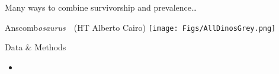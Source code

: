 \documentclass[20pt,usenames,dvipsnames]{beamer}
\begin{document}






\begin{frame}[plain]
\Huge
\begin{center}
Many ways to combine survivorship and prevalence\ldots 
\end{center}
\end{frame}



\begin{frame}[plain]
\Huge
Anscomb\emph{osaurus}~~\small (HT Alberto Cairo)
\texttt{[image: Figs/AllDinosGrey.png]}
\end{frame}


\begin{frame}[plain]
\Large
\begin{block}{Data \& Methods}
\begin{itemize}[<+->]
\item 
\end{itemize}
\end{block}
\end{frame}





\end{document}

